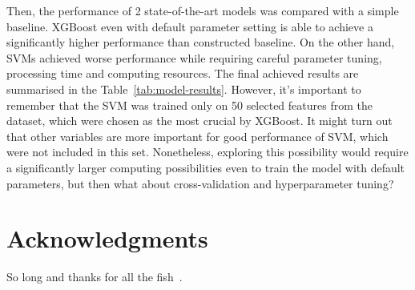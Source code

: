 \documentclass[fleqn,10pt]{SelfArx} %
\begin{document}
Then, the performance of 2 state-of-the-art models was compared with a simple baseline.
XGBoost even with default parameter setting is able to achieve a significantly higher performance than constructed baseline.
On the other hand, SVMs achieved worse performance while requiring careful parameter tuning, processing time and computing resources.
The final achieved results are summarised in the Table~\ref{tab:model-results}.
However, it's important to remember that the SVM was trained only on 50 selected features from the dataset, which were chosen as the most crucial by XGBoost.
It might turn out that other variables are more important for good performance of SVM, which were not included in this set.
Nonetheless, exploring this possibility would require a significantly larger computing possibilities even to train the model with default parameters, but then what about cross-validation and hyperparameter tuning?

\section*{Acknowledgments} %


So long and thanks for all the fish~\cite{svm}.




\end{document}
